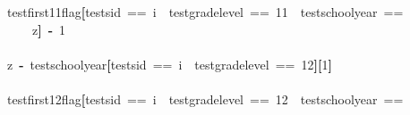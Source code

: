 \documentclass[12pt]{article}
\makeatletter
\newcommand{\hlnumber}[1]{\textcolor[rgb]{0,0,0}{#1}}%
\newcommand{\hlkeyword}[1]{\textcolor[rgb]{0,0,0}{\textbf{#1}}}%
\newcommand{\hlassignement}[1]{\textcolor[rgb]{0,0,0}{\textbf{#1}}}%
\newcommand{\hlsymbol}[1]{\textcolor[rgb]{0,0,0}{#1}}%
\newcommand{\hlstd}[1]{\textcolor[rgb]{0,0,0}{#1}}%
\newenvironment{kframe}{%
 \def\FrameCommand##1{\hskip\@totalleftmargin \hskip-\fboxsep
 \colorbox{shadecolor}{##1}\hskip-\fboxsep
     \hskip-\linewidth \hskip-\@totalleftmargin \hskip\columnwidth}%
 \MakeFramed {\advance\hsize-\width
   \@totalleftmargin\z@ \linewidth\hsize
   \@setminipage}}%
 {\par\unskip\endMakeFramed}
\newenvironment{knitrout}{}{} %
\renewenvironment{knitrout}{\begin{footnotesize}}{\end{footnotesize}}
\makeatother
\begin{document}
\begin{knitrout}
\begin{kframe}
\begin{flushleft}
\hlstd{}\hspace*{\fill}\\
\hlstd{}\hspace*{\fill}\\
\hlstd{}{\ }{\ }{\ }{\ }\hlsymbol{test}\hlkeyword{\usebox{\hlnormalsizeboxdollar}}\hlsymbol{first11\usebox{\hlnormalsizeboxunderscore}flag}\hlkeyword{[}\hlsymbol{test}\hlkeyword{\usebox{\hlnormalsizeboxdollar}}\hlsymbol{sid}{\ }=={\ }\hlsymbol{i}{\ }\hlkeyword{\usebox{\hlnormalsizeboxand}}{\ }\hlsymbol{test}\hlkeyword{\usebox{\hlnormalsizeboxdollar}}\hlsymbol{grade\usebox{\hlnormalsizeboxunderscore}level}{\ }=={\ }\hlnumber{11}{\ }\hlkeyword{\usebox{\hlnormalsizeboxand}}{\ }\hlsymbol{test}\hlkeyword{\usebox{\hlnormalsizeboxdollar}}\hlsymbol{school\usebox{\hlnormalsizeboxunderscore}year}{\ }==\hspace*{\fill}\\
\hlstd{}{\ }{\ }{\ }{\ }{\ }{\ }{\ }{\ }\hlsymbol{z}\hlkeyword{]}{\ }\hlassignement{\usebox{\hlnormalsizeboxlessthan}-}{\ }\hlnumber{1}\hspace*{\fill}\\
\hlstd{}\hspace*{\fill}\\
\hlstd{}{\ }{\ }{\ }{\ }\hlsymbol{z}{\ }\hlassignement{\usebox{\hlnormalsizeboxlessthan}-}{\ }\hlsymbol{test}\hlkeyword{\usebox{\hlnormalsizeboxdollar}}\hlsymbol{school\usebox{\hlnormalsizeboxunderscore}year}\hlkeyword{[}\hlsymbol{test}\hlkeyword{\usebox{\hlnormalsizeboxdollar}}\hlsymbol{sid}{\ }=={\ }\hlsymbol{i}{\ }\hlkeyword{\usebox{\hlnormalsizeboxand}}{\ }\hlsymbol{test}\hlkeyword{\usebox{\hlnormalsizeboxdollar}}\hlsymbol{grade\usebox{\hlnormalsizeboxunderscore}level}{\ }=={\ }\hlnumber{12}\hlkeyword{]}\hlkeyword{[}\hlnumber{1}\hlkeyword{]}\hspace*{\fill}\\
\hlstd{}\hspace*{\fill}\\
\hlstd{}{\ }{\ }{\ }{\ }\hlsymbol{test}\hlkeyword{\usebox{\hlnormalsizeboxdollar}}\hlsymbol{first12\usebox{\hlnormalsizeboxunderscore}flag}\hlkeyword{[}\hlsymbol{test}\hlkeyword{\usebox{\hlnormalsizeboxdollar}}\hlsymbol{sid}{\ }=={\ }\hlsymbol{i}{\ }\hlkeyword{\usebox{\hlnormalsizeboxand}}{\ }\hlsymbol{test}\hlkeyword{\usebox{\hlnormalsizeboxdollar}}\hlsymbol{grade\usebox{\hlnormalsizeboxunderscore}level}{\ }=={\ }\hlnumber{12}{\ }\hlkeyword{\usebox{\hlnormalsizeboxand}}{\ }\hlsymbol{test}\hlkeyword{\usebox{\hlnormalsizeboxdollar}}\hlsymbol{school\usebox{\hlnormalsizeboxunderscore}year}{\ }==\hspace*{\fill}\\

\end{flushleft}
\end{kframe}
\end{knitrout}
\end{document}
